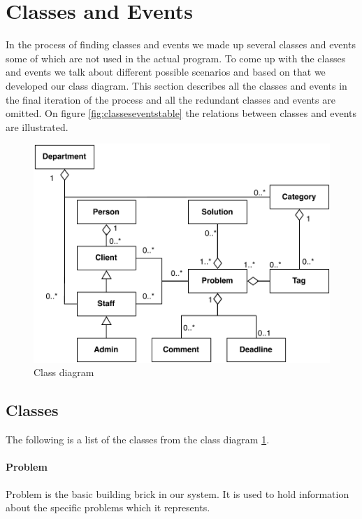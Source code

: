 \section{Classes and Events}
\label{cap:classesevents}
In the process of finding classes and events we made up several classes and events some of which are not used in the actual program. To come up with the classes and events we talk about different possible scenarios and based on that we developed our class diagram. This section describes all the classes and events in the final iteration of the process and all the redundant classes and events are omitted. On figure \ref{fig:classeseventstable} the relations between classes and events are illustrated.  

\begin{figure}
\begin{center}
\includegraphics[scale=0.6]{input/problem_domain_analysis/newest_class_diagram.pdf}
\caption{Class diagram}
\label{fig:pdaclassdiagram}
\end{center}
\end{figure}

\subsection{Classes}
The following is a list of the classes from the class diagram \ref{fig:pdaclassdiagram}.

\paragraph{Problem}
Problem is the basic building brick in our system. It is used to hold information about the specific problems which it represents.


